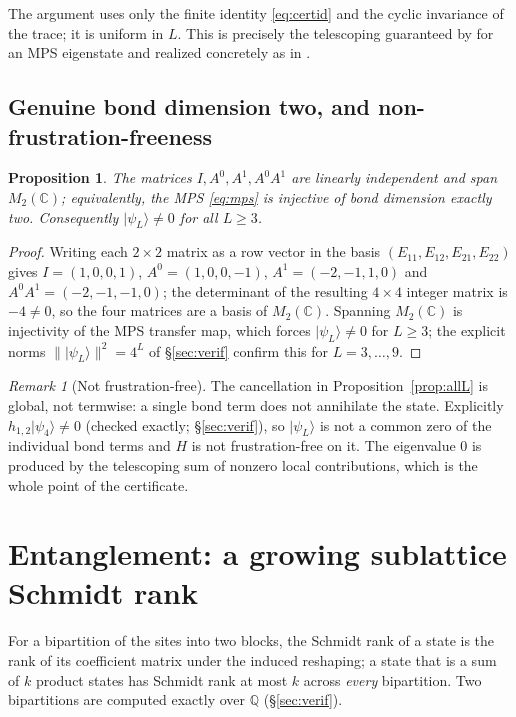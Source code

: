 \documentclass[11pt]{amsart}
\newcommand{\ket}[1]{\lvert #1 \rangle}
\newcommand{\Mtwo}{M_2(\mathbb{C})}
\newcommand{\psiL}{\ket{\psi_L}}
\theoremstyle{plain}
\newtheorem{proposition}[theorem]{Proposition}
\theoremstyle{definition}
\theoremstyle{remark}
\newtheorem{remark}[theorem]{Remark}
\begin{document}
The argument uses only the finite identity \eqref{eq:certid} and the
cyclic invariance of the trace; it is uniform in $L$. This is precisely the
telescoping guaranteed by \cite{GRMSV26} for an MPS eigenstate and realized
concretely as in \cite{GE26,DEHP93}.

\subsection{Genuine bond dimension two, and non-frustration-freeness}
\label{ssec:irr}

\begin{proposition}\label{prop:irr}
The matrices $I,A^0,A^1,A^0A^1$ are linearly independent and span $\Mtwo$;
equivalently, the MPS \eqref{eq:mps} is injective of bond dimension exactly
two. Consequently $\psiL\neq0$ for all $L\ge 3$.
\end{proposition}

\begin{proof}
Writing each $2\times2$ matrix as a row vector in the basis
$(E_{11},E_{12},E_{21},E_{22})$ gives
$I=(1,0,0,1)$, $A^0=(1,0,0,-1)$, $A^1=(-2,-1,1,0)$ and
$A^0A^1=(-2,-1,-1,0)$; the determinant of the resulting $4\times4$ integer
matrix is $-4\neq0$, so the four matrices are a basis of $\Mtwo$. Spanning
$\Mtwo$ is injectivity of the MPS transfer map, which forces $\psiL\neq0$
for $L\ge 3$; the explicit norms $\lVert\psiL\rVert^2=4^L$ of
\S\ref{sec:verif} confirm this for $L=3,\dots,9$.
\end{proof}

\begin{remark}[Not frustration-free]\label{rem:notff}
The cancellation in Proposition~\ref{prop:allL} is global, not termwise: a
single bond term does not annihilate the state. Explicitly
$h_{1,2}\ket{\psi_4}\neq0$ (checked exactly; \S\ref{sec:verif}), so $\psiL$
is not a common zero of the individual bond terms and $H$ is not
frustration-free on it. The eigenvalue $0$ is produced by the telescoping
sum of nonzero local contributions, which is the whole point of the
certificate.
\end{remark}

\section{Entanglement: a growing sublattice Schmidt rank}\label{sec:ent}

For a bipartition of the sites into two blocks, the Schmidt rank of a state
is the rank of its coefficient matrix under the induced reshaping; a state
that is a sum of $k$ product states has Schmidt rank at most $k$ across
\emph{every} bipartition. Two bipartitions are computed exactly over
$\mathbb{Q}$ (\S\ref{sec:verif}).
\end{document}
